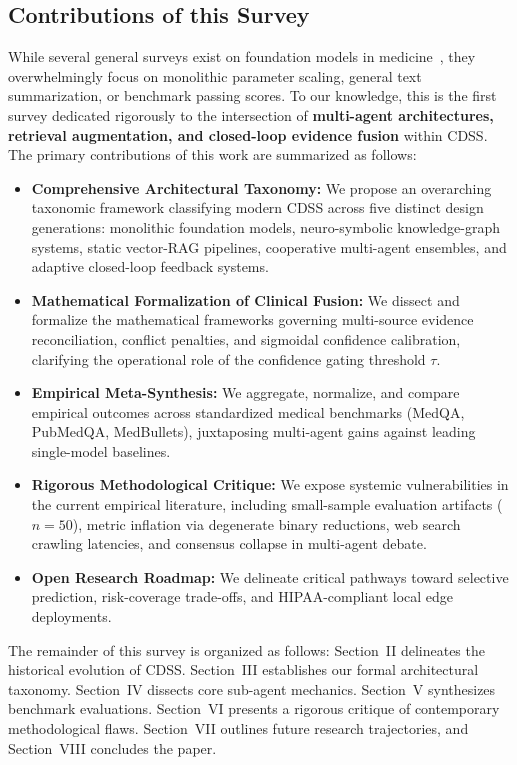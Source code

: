 \documentclass[conference]{IEEEtran}
\begin{document}
\subsection{Contributions of this Survey}
While several general surveys exist on foundation models in medicine~\cite{thirunavukarasu2023large}, they overwhelmingly focus on monolithic parameter scaling, general text summarization, or benchmark passing scores. To our knowledge, this is the first survey dedicated rigorously to the intersection of \textbf{multi-agent architectures, retrieval augmentation, and closed-loop evidence fusion} within CDSS. The primary contributions of this work are summarized as follows:
\begin{itemize}
    \item \textbf{Comprehensive Architectural Taxonomy:} We propose an overarching taxonomic framework classifying modern CDSS across five distinct design generations: monolithic foundation models, neuro-symbolic knowledge-graph systems, static vector-RAG pipelines, cooperative multi-agent ensembles, and adaptive closed-loop feedback systems.
    \item \textbf{Mathematical Formalization of Clinical Fusion:} We dissect and formalize the mathematical frameworks governing multi-source evidence reconciliation, conflict penalties, and sigmoidal confidence calibration, clarifying the operational role of the confidence gating threshold $\tau$.
    \item \textbf{Empirical Meta-Synthesis:} We aggregate, normalize, and compare empirical outcomes across standardized medical benchmarks (MedQA, PubMedQA, MedBullets), juxtaposing multi-agent gains against leading single-model baselines.
    \item \textbf{Rigorous Methodological Critique:} We expose systemic vulnerabilities in the current empirical literature, including small-sample evaluation artifacts ($n=50$), metric inflation via degenerate binary reductions, web search crawling latencies, and consensus collapse in multi-agent debate.
    \item \textbf{Open Research Roadmap:} We delineate critical pathways toward selective prediction, risk-coverage trade-offs, and HIPAA-compliant local edge deployments.
\end{itemize}

The remainder of this survey is organized as follows: Section~II delineates the historical evolution of CDSS. Section~III establishes our formal architectural taxonomy. Section~IV dissects core sub-agent mechanics. Section~V synthesizes benchmark evaluations. Section~VI presents a rigorous critique of contemporary methodological flaws. Section~VII outlines future research trajectories, and Section~VIII concludes the paper.
\end{document}
